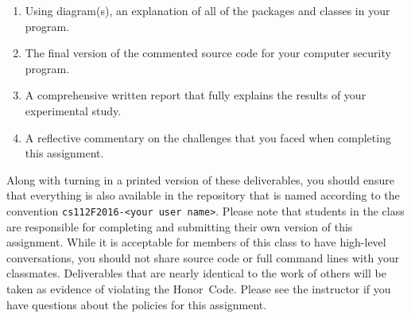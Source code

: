 \vspace*{-.1in}
\begin{enumerate}

  \itemsep0pt

  \item Using diagram(s), an explanation of all of the packages and classes in your program.

  \item The final version of the commented source code for your computer security program.

  \item A comprehensive written report that fully explains the results of your experimental study.

  \item A reflective commentary on the challenges that you faced when completing this assignment.

\end{enumerate}
\vspace*{-.1in}

Along with turning in a printed version of these deliverables, you should ensure that everything is also available in
the repository that is named according to the convention {\tt cs112F2016-<your user name>}. Please note that students in
the class are responsible for completing and submitting their own version of this assignment. While it is acceptable for
members of this class to have high-level conversations, you should not share source code or full command lines with your
classmates. Deliverables that are nearly identical to the work of others will be taken as evidence of violating the
\mbox{Honor Code}. Please see the instructor if you have questions about the policies for this assignment.


